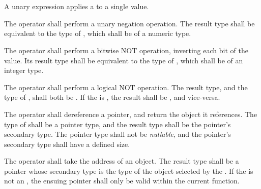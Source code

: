 
\begin{grammar}
 \\
	 \\
	 \\
	 \\
	 \\
	  \\

 \oneof \\
	\terminal{-}
	\terminal{\textasciitilde}
	\terminal{!}
	\terminal{*}
	\terminal{\&}
\end{grammar}

\specsubsubitem
A unary expression applies a  to a single value.

\specsubsubitem
The \terminal{-} operator shall perform a unary negation operation. The result
type shall be equivalent to the type of , which
shall be of a numeric type.

\specsubsubitem
The \terminal{\textasciitilde} operator shall perform a bitwise NOT operation,
inverting each bit of the value. Its result type shall be equivalent to the
type of , which shall be of an integer type.

\specsubsubitem
The \terminal{!} operator shall perform a logical NOT operation. The result
type, and the type of , shall both be
. If the  is , the
result shall be , and vice-versa.

\specsubsubitem
The \terminal{*} operator shall dereference a pointer, and return the object it
references.  The type of  shall be a pointer
type, and the result type shall be the pointer's secondary type. The pointer
type shall not be \textit{nullable}, and the pointer's secondary type shall have
a defined size.

\specsubsubitem
The \terminal{\&} operator shall take the address of an object. The result type
shall be a pointer whose secondary type is the type of the object selected by
the . If the  is not
an , the ensuing pointer shall only be valid within
the current function.

